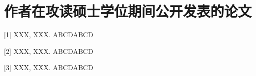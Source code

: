 \chapter{作者在攻读硕士学位期间公开发表的论文}

[1] XXX, XXX. ABCDABCD

[2] XXX, XXX. ABCDABCD

[3] XXX, XXX. ABCDABCD
